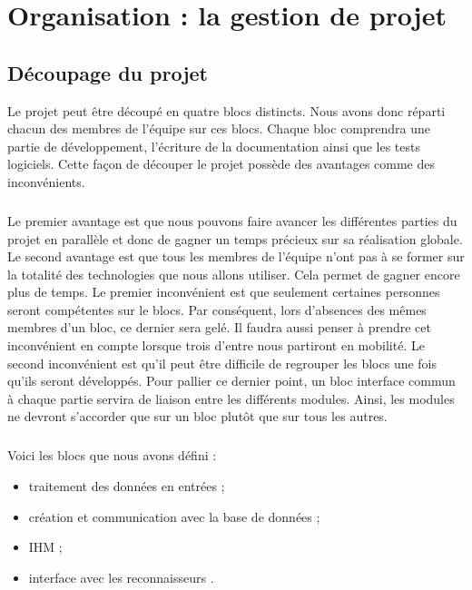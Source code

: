 \chapter{Organisation : la gestion de projet}

\section{Découpage du projet}

Le projet peut être découpé en quatre blocs distincts. Nous avons donc réparti chacun des membres de l’équipe sur ces blocs. Chaque bloc comprendra une partie de développement, l’écriture de la documentation ainsi que les tests logiciels. Cette façon de découper le projet possède des avantages comme des inconvénients.

\paragraph{}

Le premier avantage est que nous pouvons faire avancer les différentes parties du projet en parallèle et donc de gagner un temps précieux sur sa réalisation globale. Le second avantage est que tous les membres de l’équipe n’ont pas à se former sur la totalité des technologies que nous allons utiliser. Cela permet de gagner encore plus de temps. Le premier inconvénient est que seulement certaines personnes seront compétentes sur le blocs. Par conséquent, lors d’absences des mêmes membres d’un bloc, ce dernier sera gelé. Il faudra aussi penser à prendre cet inconvénient en compte lorsque trois d’entre nous partiront en mobilité. Le second inconvénient est qu’il peut être difficile de regrouper les blocs une fois qu’ils seront développés. Pour pallier ce dernier point, un bloc interface commun à chaque partie servira de liaison entre les différents modules. Ainsi, les modules ne devront s’accorder que sur un bloc plutôt que sur tous les autres.

\paragraph{}

Voici les blocs que nous avons défini :

\begin{itemize}
\item traitement des données en entrées ;
\item création et communication avec la base de données  ;
\item IHM ;
\item interface avec les reconnaisseurs .
\end{itemize}

